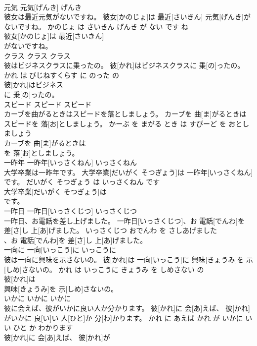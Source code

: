\documentclass[8pt]{extreport}
\begin{document}
\begin{CJK}{UTF8}{min}
\\	元気	元気[げんき]	げんき	
\\	彼女は最近元気がないですね。	彼女[かのじょ]は 最近[さいきん] 元気[げんき]がないですね。	かのじょ は さいきん げんき が ない です ね	
\\	彼女[かのじょ]は 最近[さいきん]
\\	がないですね。			
\\	クラス	クラス	クラス	
\\	彼はビジネスクラスに乗ったの。	彼[かれ]はビジネスクラスに 乗[の]ったの。	かれ は びじねすくらす に のった の	
\\	彼[かれ]はビジネス
\\	に 乗[の]ったの。			
\\	スピード	スピード	スピード	
\\	カーブを曲がるときはスピードを落としましょう。	カーブを 曲[ま]がるときはスピードを 落[お]としましょう。	かーぶ を まがる とき は すぴーど を おとしましょう	
\\	カーブを 曲[ま]がるときは
\\	を 落[お]としましょう。			
\\	一昨年	一昨年[いっさくねん]	いっさくねん	
\\	大学卒業は一昨年です。	大学卒業[だいがく そつぎょう]は 一昨年[いっさくねん]です。	だいがく そつぎょう は いっさくねん です	
\\	大学卒業[だいがく そつぎょう]は
\\	です。			
\\	一昨日	一昨日[いっさくじつ]	いっさくじつ	
\\	一昨日、お電話を差し上げました。	一昨日[いっさくじつ]、お 電話[でんわ]を 差[さ]し 上[あ]げました。	いっさくじつ おでんわ を さしあげました	
\\	、お 電話[でんわ]を 差[さ]し 上[あ]げました。			
\\	一向に	一向[いっこう]に	いっこうに	
\\	彼は一向に興味を示さないの。	彼[かれ]は 一向[いっこう]に 興味[きょうみ]を 示[しめ]さないの。	かれ は いっこうに きょうみ を しめさない の	
\\	彼[かれ]は
\\	興味[きょうみ]を 示[しめ]さないの。			
\\	いかに	いかに	いかに	
\\	彼に会えば、彼がいかに良い人か分かります。	彼[かれ]に 会[あ]えば、 彼[かれ]がいかに 良[い]い 人[ひと]か 分[わ]かります。	かれ に あえば かれ が いかに いい ひと か わかります	
\\	彼[かれ]に 会[あ]えば、 彼[かれ]が

\end{CJK}
\end{document}
